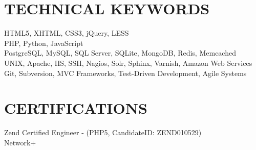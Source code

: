 \documentclass{res}
\begin{document}
\begin{resume}
\section{TECHNICAL KEYWORDS}  

    HTML5, XHTML, CSS3, jQuery, LESS \\
    PHP, Python, JavaScript \\
    PostgreSQL, MySQL, SQL Server, SQLite, MongoDB, Redis, Memcached \\
    UNIX, Apache, IIS, SSH, Nagios, Solr, Sphinx, Varnish, Amazon Web Services \\
    Git, Subversion, MVC Frameworks, Test-Driven Development, Agile Systems

 
\section{CERTIFICATIONS}
    Zend Certified Engineer - (PHP5, CandidateID: ZEND010529) \\
    Network+
 
\end{resume}
\end{document}
